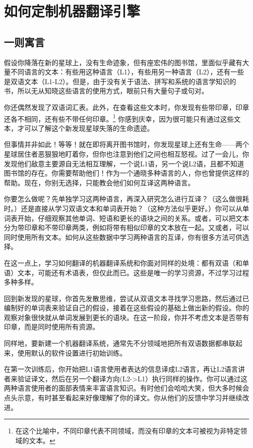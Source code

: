 \documentclass[output=paper]{langscibook}
\begin{document}
\section{如何定制机器翻译引擎}
\subsection{一则寓言}
假设你降落在新的星球上，没有生命迹象，但有座宏伟的图书馆，里面似乎藏有大量不同语言的文本：有些用这种语言（L1），有些用另一种语言（L2），还有一些是双语文本（L1-L2）。但是，由于没有关于语法、拼写和系统的语言学知识的书，所以无从知晓这些语言的使用方式，眼前只有大量句子或句对。

你还偶然发现了双语词汇表。此外，在查看这些文本时，你发现有些带印章，印章还各不相同，还有些不带任何印章。\footnote{在这个比喻中，不同印章代表不同领域，而没有印章的文本可被视为非特定领域的文本。} 你感到庆幸，因为很可能只有通过这些文本，才可以了解这个新发现星球失落的生命遗迹。

但事情并非如此！等等！就在即将离开图书馆时，你发现星球上还有生命——两个星球居住者恶狠狠地盯着你，但你也注意到他们之间也相互怒视。过了一会儿，你发现他们敌意主要源自无法相互理解，一个说L1语，另一个说L2语，且都不知道图书馆的存在。你需要帮助他们！作为一个通晓多种语言的人，你也曾提供这样的帮助。现在，你别无选择，只能教会他们如何互译这两种语言。

你要怎么做呢？先单独学习这两种语言，再深入研究怎么进行互译？（这么做很耗时。）还是直接从学习双语文本和单词表开始？（这种方法似乎更好。）你可以从单词表开始，仔细观察其他单词、短语和更长的语块之间的关系。或者，可以把文本分为带印章和不带印章两类，例如将带有相似印章的文本放在一起。又或者，可以同时使用所有文本。如何从这些数据中学习两种语言的互译，你有很多方法可供选择。

在这一点上，学习如何翻译的机器翻译系统和你面对同样的处境：都有双语（和单语）文本，可能还有术语表，但仅此而已。这些是唯一的学习资源，不过学习过程多种多样。

回到新发现的星球，你首先发散思维，尝试从双语文本寻找学习思路，然后通过已编制好的单词表来验证自己的假设，接着在这些假设的基础上做出新的假设。你的观察对象很快就从单词发展到更长的语块。在这一阶段，你并不考虑文本是否带有印章，而是同时使用所有资源。

同样地，要新建一个机器翻译系统，通常先不分领域地把所有双语数据都串联起来，使用默认的软件设置进行初始训练。

在第一次训练后，你开始把L1语言使用者表达的信息译成L2语言，再让L2语言讲者来验证译文，然后在另一个翻译方向(L2->L1）执行同样的操作。你可以通过这两种语言使用者的面部表情来丰富语言知识。有时他们会哈哈大笑，但大多时候会点头示意，有时甚至看起来好像理解了你的译文。你从他们的反馈中学习并继续改进。
\end{document}
